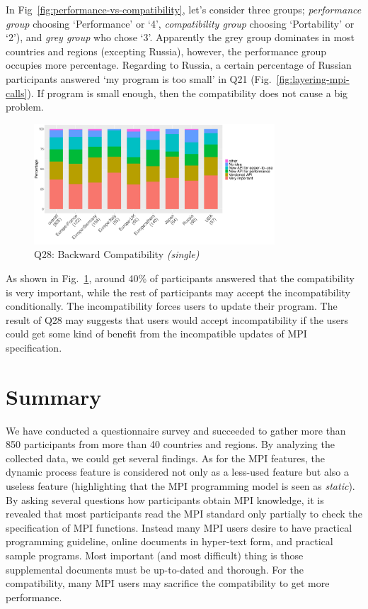 \documentclass[conference,10pt,letterpaper]{IEEEtran}
\def\myquote#1{`#1'}
\begin{document}
In Fig~\ref{fig:performance-vs-compatibility}, let's consider three
groups; {\it performance group} choosing \myquote{Performance} or
\myquote{4}, {\it compatibility group} choosing \myquote{Portability} or
\myquote{2}), and {\it grey group} who chose \myquote{3}. Apparently the grey
group dominates in most countries and regions (excepting Russia),
however, the performance group occupies more percentage. Regarding to
Russia, a certain percentage of Russian participants answered
\myquote{my program is too small} in Q21
(Fig.~\ref{fig:layering-mpi-calls}). If program is small enough, then
the compatibility does not cause a big problem.

\begin{figure}[htb]
\begin{center}
\includegraphics[width=9cm]{R-scripts/Q28.pdf}
\caption{Q28: Backward Compatibility {\it(single)}}
\label{fig:compatibility}
\end{center}
\end{figure}

As shown in Fig.~\ref{fig:compatibility}, around 40\% of participants
answered that the compatibility is very important, while the rest of
participants may accept the incompatibility conditionally. The
incompatibility forces users to update their program. The result of
Q28 may suggests that users would accept incompatibility if the users
could get some kind of benefit from the incompatible updates of MPI
specification. 

\section{Summary}

We have conducted a questionnaire survey and succeeded to gather more
than 850 participants from more than 40 countries and regions. By
analyzing the collected data, we could get several findings. As for
the MPI features, the dynamic process feature is considered not only
as a less-used feature but also a useless feature (highlighting that
the MPI programming model is seen as {\em static}). By asking several
questions how participants obtain MPI knowledge, it is revealed that
most participants read the MPI standard only partially to check the
specification of MPI functions. Instead many MPI users desire to have
practical programming guideline, online documents in
hyper-text form, and practical sample programs. Most important
(and most difficult) thing is those supplemental
documents must be up-to-dated and thorough. For the
compatibility, many MPI users may sacrifice the compatibility to get
more performance. 
\end{document}
